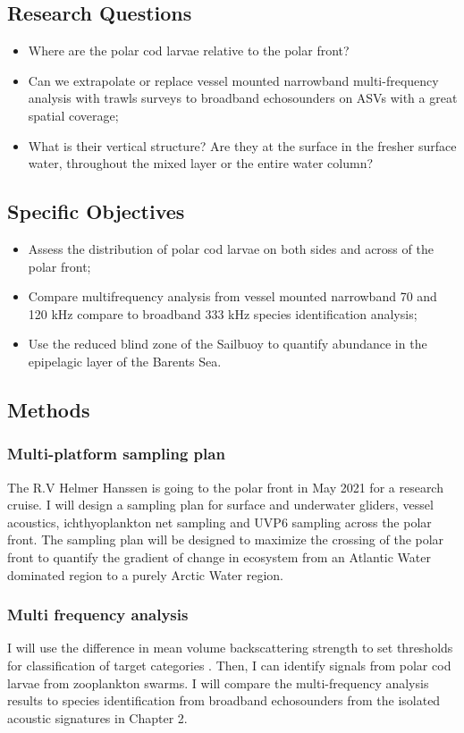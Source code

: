 \documentclass[a4paper, 12pt, Ariel]{article}
\begin{document}
\subsection{Research Questions}
\begin{itemize}
	\item{Where are the polar cod larvae relative to the polar front? }
	\item{Can we extrapolate or replace vessel mounted narrowband multi-frequency analysis with trawls surveys to broadband echosounders on ASVs with a great spatial coverage;}
	\item{What is their vertical structure? Are they at the surface in the fresher surface water, throughout the mixed layer or the entire water column?}
\end{itemize}

\subsection{Specific Objectives}
\begin{itemize}
	\item{Assess the distribution of polar cod larvae on both sides and across of the polar front;}
	\item{Compare multifrequency analysis from vessel mounted narrowband 70 and 120 kHz compare to broadband 333 kHz species identification analysis;}
	\item{Use the reduced blind zone of the Sailbuoy to quantify abundance in the epipelagic layer of the Barents Sea.}
\end{itemize}

\subsection{Methods}
\subsubsection {Multi-platform sampling plan}
The R.V Helmer Hanssen is going to the polar front in May 2021 for a research cruise. I will design a sampling plan for surface and underwater gliders, vessel acoustics, ichthyoplankton net sampling and UVP6 sampling across the polar front. The sampling plan will be designed to maximize the crossing of the polar front to quantify the gradient of change in ecosystem from an Atlantic Water dominated region to a purely Arctic Water region.

\subsubsection {Multi frequency analysis}
I will use the difference in mean volume backscattering strength to set thresholds for classification of target categories \cite{Bouchard2017, LeBlanc2019}. Then, I can identify signals from polar cod larvae from zooplankton swarms. I will compare the multi-frequency analysis results to species identification from broadband echosounders from the isolated acoustic signatures in Chapter 2.
\end{document}
